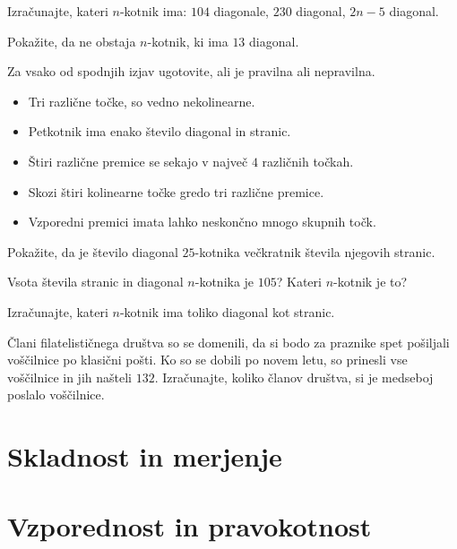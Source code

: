             \begin{naloga}
                Izračunajte, kateri $n$-kotnik ima: $104$ diagonale, $230$ diagonal, $2n-5$ diagonal.
            \end{naloga}

            \begin{naloga}
                Pokažite, da ne obstaja $n$-kotnik, ki ima $13$ diagonal.  
            \end{naloga}
            

            \begin{naloga}
                Za vsako od spodnjih izjav ugotovite, ali je pravilna ali nepravilna.
                \begin{itemize}
                    \item Tri različne točke, so vedno nekolinearne.
                    \item Petkotnik ima enako število diagonal in stranic.
                    \item Štiri različne premice se sekajo v največ $4$ različnih točkah.
                    \item Skozi štiri kolinearne točke gredo tri različne premice.
                    \item Vzporedni premici imata lahko neskončno mnogo skupnih točk.
                \end{itemize}
            \end{naloga}

            \begin{naloga}
                Pokažite, da je število diagonal $25$-kotnika večkratnik števila njegovih stranic.
            \end{naloga}

            \begin{naloga}
                Vsota števila stranic in diagonal $n$-kotnika je $105$? Kateri $n$-kotnik je to?
            \end{naloga}
        

            \begin{naloga}
                Izračunajte, kateri $n$-kotnik ima toliko diagonal kot stranic.
            \end{naloga}

            \begin{naloga}
                Člani filatelističnega društva so se domenili, da si bodo za praznike spet pošiljali voščilnice po klasični pošti.
                Ko so se dobili po novem letu, so prinesli vse voščilnice in jih našteli $132$.
                Izračunajte, koliko članov društva, si je medseboj poslalo voščilnice.                
            \end{naloga}


        

\newpage


\section{Skladnost in merjenje}






\newpage


\section{Vzporednost in pravokotnost}